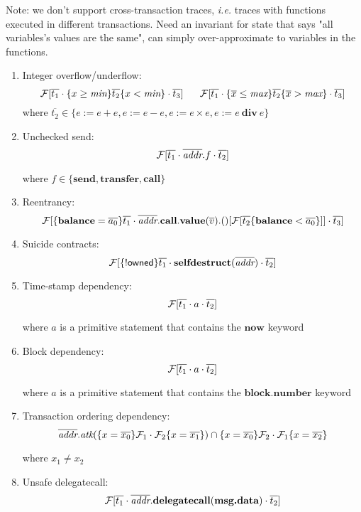 Note: we don't support cross-transaction traces, \emph{i.e.} traces with functions executed in different transactions. Need an invariant for state that says "all variables's values are the same", can simply over-approximate to variables in the functions.
\begin{enumerate}
	\item Integer overflow/underflow:
	$$
	\mathcal{F}[\overline{t_1} \cdot \{x \geq \textit{min}\}\overline{t_2}\{x < \textit{min}\} \cdot \overline{t_3}]
	~~~~~
	\mathcal{F}[\overline{t_1} \cdot \{\overline{x} \leq \textit{max}\}\overline{t_2}\{\overline{x} > \textit{max}\} \cdot \overline{t_3}]
	$$
	where $\overline{t_2} \in \{e:= e + e, e:= e - e, e:= e \times e, e:= e~\textbf{div}~e\}$
	\item Unchecked send:
	$$
	\mathcal{F}[\overline{t_1} \cdot \overline{\textit{addr}}.f \cdot \overline{t_2}]
	$$
	
	where $f \in \{\textbf{send},\textbf{transfer},\textbf{call}\}$
	\item Reentrancy:
	$$
	\mathcal{F}[\{\textbf{balance} = \overline{a_0}\}\overline{t_1} \cdot \overline{\textit{addr}}.\textbf{call}.\textbf{value}(\overline{v}).()[\mathcal{F}[\overline{t_2}\{\textbf{balance} < \overline{a_0}\}]] \cdot \overline{t_3}]
	$$
	
	\item Suicide contracts:
	$$
	\mathcal{F}[\{!\textsf{owned}\}\overline{t_1} \cdot \textbf{selfdestruct}(\overline{\textit{addr}}) \cdot \overline{t_2}]
	$$
	\item Time-stamp dependency:
	$$
\mathcal{F}[\overline{t_1} \cdot a \cdot \overline{t_2}]
$$

where $a$ is a primitive statement that contains the $\textbf{now}$ keyword

	\item Block dependency:
	$$
	\mathcal{F}[\overline{t_1} \cdot a \cdot \overline{t_2}]
	$$
	
	where $a$ is a primitive statement that contains the $\textbf{block}.\textbf{number}$ keyword
	
	
	\item Transaction ordering dependency:
	$$
	\overline{\textit{addr}}.\textit{atk}(\{x = \overline{x_0}\}\mathcal{F}_1 \cdot \mathcal{F}_2\{x = \overline{x_1}\}) \cap \{x = \overline{x_0}\}\mathcal{F}_2  \cdot \mathcal{F}_1 \{x = \overline{x_2}\}
	$$
	
	where $x_1 \neq x_2$
	\item Unsafe delegatecall:
	$$
	\mathcal{F}[\overline{t_1} \cdot \overline{\textit{addr}}.\textbf{delegatecall}(\textbf{msg.data}) \cdot \overline{t_2}]
	$$
\end{enumerate}


